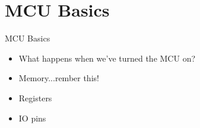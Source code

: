 \documentclass[main.tex]{subfiles}
\begin{document}
\section{MCU Basics} 
\label{sec:mcu_basics}

\begin{frame}{MCU Basics}
	\begin{itemize}
		\item What happens when we've turned the MCU on?
		\item Memory...rember this!
		\item Registers
		\item IO pins
	\end{itemize}
\end{frame}

\end{document}
